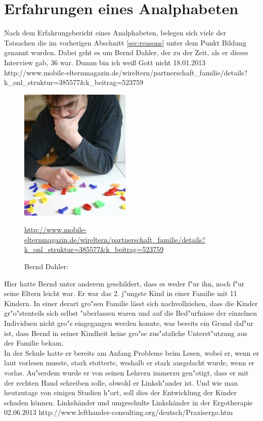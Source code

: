 \section{Erfahrungen eines Analphabeten}


Nach dem Erfahrungsbericht eines Analphabeten, belegen sich viele der Tatsachen die im vorherigen Abschnitt \ref{sec:reasons} unter dem Punkt Bildung genannt wurden. Dabei geht es um Bernd Dahler, der zu der Zeit, als er dieses Interview gab, 36 war.
				{Dumm bin ich weiß Gott nicht}
				{18.01.2013}
				{http://www.mobile-elternmagazin.de/wireltern/partnerschaft_familie/details?k_onl_struktur=385577&k_beitrag=523759}\\


\begin{figure}[h]
	\centering
		\includegraphics[scale=0.80]{Daten/BerndDahler.jpg}
	\caption{Bernd Dahler:} 
	\url{http://www.mobile-elternmagazin.de/wireltern/partnerschaft_familie/details?k_onl_struktur=385577&k_beitrag=523759}
	\label{fig:BerndDahler}
\end{figure}

Hier hatte Bernd unter anderem geschildert, dass es weder f"ur ihn, noch f"ur seine Eltern leicht war. Er war das 2. j"ungste Kind in einer Familie mit 11 Kindern. In einer derart gro"sen Familie lässt sich nachvollziehen, dass die Kinder gr"o"stenteils sich selbst "uberlassen waren und auf die Bed"urfnisse der einzelnen Individuen nicht gro"s eingegangen werden konnte, was bereits ein Grund daf"ur ist, dass Bernd in seiner Kindheit keine gro"se zus"atzliche Unterst"utzung aus der Familie bekam.\\

In der Schule hatte er bereits am Anfang Probleme beim Lesen, wobei er, wenn er laut vorlesen musste, stark stotterte, weshalb er stark ausgelacht wurde, wenn er vorlas. Au"serdem wurde er von seinen Lehrern immerzu gen"otigt, dass er mit der rechten Hand schreiben solle, obwohl er Linksh"ander ist. Und wie man heutzutage von einigen Studien h"ort, soll dies der Entwicklung der Kinder schaden können.
				{Linkshänder und umgeschulte Linkshänder in der Ergotherapie }
				{02.06.2013}
				{http://www.lefthander-consulting.org/deutsch/Praxisergo.htm}\

